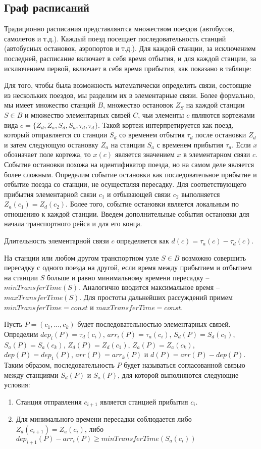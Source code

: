 \subsection{Граф расписаний}
Традиционно расписания представляются множеством поездов (автобусов, самолетов и т.д.). Каждый поезд посещает последовательность станций (автобусных остановок, аэропортов и т.д.). Для каждой станции, за исключением последней, расписание включает в себя время отбытия, и для каждой станции, за исключением первой, включает в себя время прибытия, как показано в таблице:

Для того, чтобы была возможность математически определить связи, состоящие из нескольких поездов, мы разделим их в элементарные связи. Более формально, мы имеет множество станций $B$, множество остановок $Z_S$ на каждой станции $S \in B$ и множество элементарных связей $C$, чьи элементы $c$ являются кортежами вида $c=\{Z_d,Z_a,S_d,S_a,\tau_d,\tau_d\}$. Такой кортеж интерпретируется как поезд, который отправляется со станции $S_d$ со временем отбытия $\tau_d$ после остановки $Z_d$ и затем следующую остановку $Z_a$ на станции $S_a$ с временем прибытия $\tau_a$. Если $x$ обозначает поле кортежа, то $x(c)$ является значением $x$ в элементарном связи $c$. Событие остановки похожа на идентификатор поезда, но на самом деле является более сложным. Определим событие остановки как последовательное прибытие и отбытие поезда со станции, не осуществляя пересадку. Для соответствующего прибытия элементарной связи $c_1$ и отбывающей связи $c_2$ выполняется $Z_a(c_1)=Z_d(c_2)$. Более того, событие остановки является локальным по отношению к каждой станции. Введем дополнительные события остановки для начала транспортного рейса и для его конца.

\begin{definition}
	Длительность элементарной связи $c$ определяется как $d(c)=\tau_a(c)-\tau_d(c)$.
\end{definition}

На станции или любом другом транспортном узле $S \in B$ возможно совершить пересадку с одного поезда на другой, если время между прибытием и отбытием на станции $S$ больше и равно минимальному времени пересадку -- $minTransferTime(S)$. Аналогично вводится максимальное время -- $maxTransferTime(S)$. Для простоты дальнейших рассуждений примем $minTransferTime = const$ и $maxTransferTime = const$.

Пусть $P=(c_1, ..., c_k)$ будет последовательностью элементарных связей. Определим $dep_i(P)=\tau_d(c_i)$, $arr_i(P)=\tau_a(c_i)$, $S_d(P)=S_d(c_1)$, $S_a(P)=S_a(c_k)$, $Z_d(P)=Z_d(c_1)$, $Z_a(P)=Z_a(c_k)$, $dep(P)=dep_1(P)$, $arr(P)=arr_k(P)$ и $d(P)=arr(P)-dep(P)$. Таким образом, последовательность $P$ будет называться согласованной связью между станциями $S_d(P)$ и $S_a(P)$, для которой выполняются следующие условия:
\begin{enumerate}
	\item Станция отправления $c_{i+1}$ является станцией прибытия $c_i$.
	\item Для минимального времени пересадки соблюдается либо $Z_d(c_{i+1})=Z_a(c_i)$, либо $dep_{i+1}(P)-arr_i(P) \geqslant minTransferTime(S_a(c_i))$ 
\end{enumerate}

